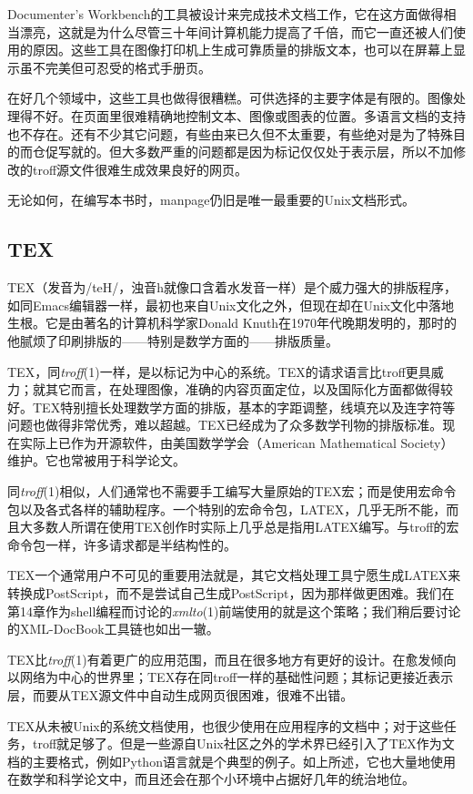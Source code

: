 \documentclass[12pt,oneside]{book}
\begin{document}
Documenter's Workbench的工具被设计来完成技术文档工作，它在这方面做得相当漂亮，这就是为什么尽管三十年间计算机能力提高了千倍，而它一直还被人们使用的原因。这些工具在图像打印机上生成可靠质量的排版文本，也可以在屏幕上显示虽不完美但可忍受的格式手册页。

在好几个领域中，这些工具也做得很糟糕。可供选择的主要字体是有限的。图像处理得不好。在页面里很难精确地控制文本、图像或图表的位置。多语言文档的支持也不存在。还有不少其它问题，有些由来已久但不太重要，有些绝对是为了特殊目的而仓促写就的。但大多数严重的问题都是因为标记仅仅处于表示层，所以不加修改的troff源文件很难生成效果良好的网页。

无论如何，在编写本书时，manpage仍旧是唯一最重要的Unix文档形式。

\subsection{TEX}
TEX（发音为/teH/，浊音h就像口含着水发音一样）是个威力强大的排版程序，如同Emacs编辑器一样，最初也来自Unix文化之外，但现在却在Unix文化中落地生根。它是由著名的计算机科学家Donald Knuth在1970年代晚期发明的，那时的他腻烦了印刷排版的——特别是数学方面的——排版质量。

TEX，同\textit{troff}(1)一样，是以标记为中心的系统。TEX的请求语言比troff更具威力；就其它而言，在处理图像，准确的内容页面定位，以及国际化方面都做得较好。TEX特别擅长处理数学方面的排版，基本的字距调整，线填充以及连字符等问题也做得非常优秀，难以超越。TEX已经成为了众多数学刊物的排版标准。现在实际上已作为开源软件，由美国数学学会（American Mathematical Society）维护。它也常被用于科学论文。

同\textit{troff}(1)相似，人们通常也不需要手工编写大量原始的TEX宏；而是使用宏命令包以及各式各样的辅助程序。一个特别的宏命令包，LATEX，几乎无所不能，而且大多数人所谓在使用TEX创作时实际上几乎总是指用LATEX编写。与troff的宏命令包一样，许多请求都是半结构性的。

TEX一个通常用户不可见的重要用法就是，其它文档处理工具宁愿生成LATEX来转换成PostScript，而不是尝试自己生成PostScript，因为那样做更困难。我们在第14章作为shell编程而讨论的\textit{xmlto}(1)前端使用的就是这个策略；我们稍后要讨论的XML-DocBook工具链也如出一辙。

TEX比\textit{troff}(1)有着更广的应用范围，而且在很多地方有更好的设计。在愈发倾向以网络为中心的世界里；TEX存在同troff一样的基础性问题；其标记更接近表示层，而要从TEX源文件中自动生成网页很困难，很难不出错。

TEX从未被Unix的系统文档使用，也很少使用在应用程序的文档中；对于这些任务，troff就足够了。但是一些源自Unix社区之外的学术界已经引入了TEX作为文档的主要格式，例如Python语言就是个典型的例子。如上所述，它也大量地使用在数学和科学论文中，而且还会在那个小环境中占据好几年的统治地位。
\end{document}
